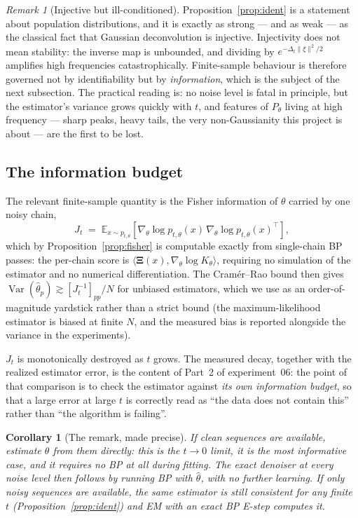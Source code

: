 \documentclass[11pt]{article}
\newtheorem{corollary}{Corollary}
\theoremstyle{remark}
\newtheorem{remark}{Remark}
\newcommand{\E}{\mathbb{E}}
\newcommand{\Var}{\operatorname{Var}}
\newcommand{\Xibf}{\bm{\Xi}}
\begin{document}
\begin{remark}[Injective but ill-conditioned]
Proposition~\ref{prop:ident} is a statement about population distributions, and
it is exactly as strong --- and as weak --- as the classical fact that Gaussian
deconvolution is injective. Injectivity does not mean stability: the inverse map
is unbounded, and dividing by $e^{-\Delta_t\|\xi\|^2/2}$ amplifies high
frequencies catastrophically. Finite-sample behaviour is therefore governed not
by identifiability but by \emph{information}, which is the subject of the next
subsection. The practical reading is: no noise level is fatal in principle, but
the estimator's variance grows quickly with $t$, and features of $P_\theta$
living at high frequency --- sharp peaks, heavy tails, the very non-Gaussianity
this project is about --- are the first to be lost.
\end{remark}

\subsection{The information budget}

The relevant finite-sample quantity is the Fisher information of $\theta$
carried by one noisy chain,
\begin{equation}
  J_t \;=\; \E_{x \sim p_{t,\theta}}\!\left[
    \nabla_\theta \log p_{t,\theta}(x)\,
    \nabla_\theta \log p_{t,\theta}(x)^{\!\top}\right],
  \label{eq:fisher-info}
\end{equation}
which by Proposition~\ref{prop:fisher} is computable exactly from single-chain BP
passes: the per-chain score is $\langle \Xibf(x), \nabla_\theta \log K_\theta\rangle$,
requiring no simulation of the estimator and no numerical differentiation. The
Cram\'er--Rao bound then gives $\Var(\hat\theta_p) \gtrsim [J_t^{-1}]_{pp}/N$
for unbiased estimators, which we use as an order-of-magnitude yardstick rather
than a strict bound (the maximum-likelihood estimator is biased at finite $N$,
and the measured bias is reported alongside the variance in the experiments).

$J_t$ is monotonically destroyed as $t$ grows. The measured decay, together with
the realized estimator error, is the content of Part~2 of experiment~06:
the point of that comparison is to check the estimator against \emph{its own
information budget}, so that a large error at large $t$ is correctly read as
``the data does not contain this'' rather than ``the algorithm is failing''.

\begin{corollary}[The remark, made precise]
If clean sequences are available, estimate $\theta$ from them directly: this is
the $t\to0$ limit, it is the most informative case, and it requires no BP at all
during fitting. The exact denoiser at \emph{every} noise level then follows by
running BP with $\hat\theta$, with no further learning. If only noisy sequences
are available, the same estimator is still consistent for any finite $t$
(Proposition~\ref{prop:ident}) and EM with an exact BP E-step computes it.
\end{corollary}
\end{document}
